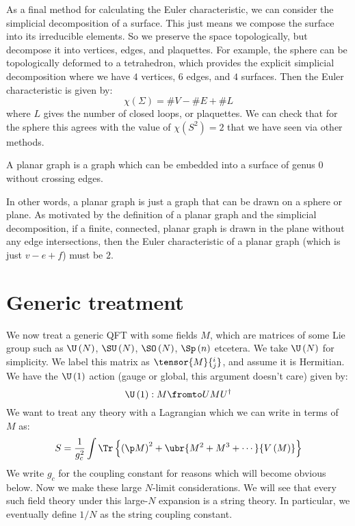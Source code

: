 \documentclass{booc}
\begin{document}
As a final method for calculating the Euler characteristic, we can 
consider the simplicial decomposition of a surface. 
This just means we compose the surface into its irreducible elements.
So we preserve the space topologically, but 
decompose it into vertices, edges, and plaquettes. 
For example, the sphere can be topologically deformed to a tetrahedron, 
which provides the explicit simplicial decomposition
where we have $4$ vertices, $6$ edges, and $4$ surfaces. Then the Euler characteristic is given by:
\begin{equation}
\chi\left( \Sigma \right) = \# V - \# E + \# L
\end{equation}
where $L$ gives the number of closed loops, or plaquettes. 
We can check that for the sphere this agrees with the value of $\chi\left( S^2 \right) = 2$
that we have seen via other methods.

\begin{defn}
A planar graph is 
a graph which can be embedded into a surface of genus $0$ without crossing edges. 
\end{defn}

In other words, a planar graph is just a graph that can be drawn on a sphere or plane.
As motivated by the definition of a planar graph and the simplicial decomposition, 
if a finite, connected, planar graph is drawn in the plane without any edge intersections,
then the Euler characteristic of a planar graph (which is just $v - e + f$)
must be $2$.

\section{Generic treatment}

We now treat a generic QFT with some fields $M$, which are
matrices of some Lie group such as $\U\left( N \right)$, 
$\SU\left( N \right)$, $\SO\left( N \right)$, $\Sp\left( n \right)$ etcetera. 
We take $\U\left( N\right)$ for simplicity. 
We label this matrix as $\tensor{M}{^i_j}$, and assume it is Hermitian.
We have the $\U\left( 1 \right)$ action (gauge or global, this argument doesn't care)
given by:
\begin{equation}
\U\left( 1 \right): M\fromto U M U^\dag
\end{equation}
We want to treat any theory with a Lagrangian which we can write 
in terms of $M$ as:
\begin{equation}
S = \frac{1}{g_c^2}\int \Tr\left\{ \left( \p M \right)^2
+ \ubr{M^2 + M^3 + \cdots}{V\left( M \right)} \right\}
\end{equation}
We write $g_c$ for the coupling constant for reasons which will become obvious below.
Now we make these large $N$-limit considerations. 
We will see that every such field theory under this large-$N$
expansion is a string theory.
In particular, we eventually define $1/N$ as the string coupling constant.
\end{document}
